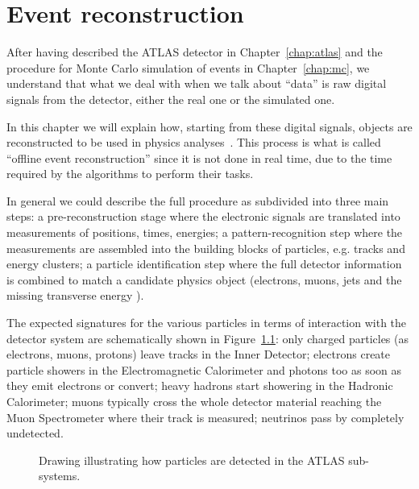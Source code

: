 \clearpage{\pagestyle{empty}\cleardoublepage}

\chapter{Event reconstruction}\label{chap:objects}

After having described the ATLAS detector in Chapter~\ref{chap:atlas} 
and the procedure for Monte Carlo simulation of events in Chapter~\ref{chap:mc},
we understand that what we deal with when we talk about ``data'' 
is raw digital signals from the detector,
either the real one or the simulated one.

In this chapter we will explain how, starting from these digital signals,
objects are reconstructed to be used in physics analyses~\cite{Aad:2009wy}. 
This process is what is called ``offline event reconstruction'' since
it is not done in real time, due to the time required by the algorithms
to perform their tasks.

In general we could describe the full procedure as subdivided into
three main steps: a pre-reconstruction stage where the electronic signals are
translated into measurements of positions, times, energies; 
a pattern-recognition step where the measurements
are assembled into the building blocks of particles, e.g. tracks and energy clusters;
a particle identification step where the full detector information 
is combined to match a candidate physics object 
(electrons, muons, jets and the missing transverse energy \met).

The expected signatures for the various particles in terms of interaction
with the detector system are schematically shown in Figure~\ref{fig:decaychart}:
only charged particles (as electrons, muons, protons) leave tracks in the Inner
Detector; electrons create particle showers in the Electromagnetic Calorimeter
and photons too as soon as they emit electrons or convert; heavy hadrons
start showering in the Hadronic Calorimeter; muons typically cross the whole
detector material reaching the Muon Spectrometer where their track is measured;
neutrinos pass by completely undetected.

\begin{figure}[tb]\begin{center}
	\caption{Drawing illustrating how particles are detected in the ATLAS sub-systems.
	\label{fig:decaychart}}
\end{center}\end{figure}

